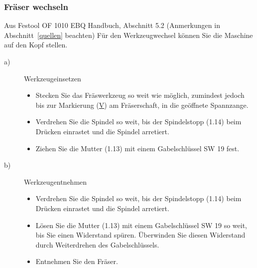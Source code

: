 \documentclass{\basedir/fablab-document}
\begin{document}
\subsubsection{Fräser wechseln}
\begin{leftbar}{Aus Festool OF 1010 EBQ Handbuch, Abschnitt 5.2 (Anmerkungen in Abschnitt~\ref{quellen} beachten)}
Für den Werkzeugwechsel können Sie die Maschine auf den Kopf stellen.
\begin{description}
    \item[a)] Werkzeugeinsetzen
        \begin{itemize}
            \item Stecken Sie das Fräswerkzeug so weit wie möglich, zumindest jedoch bis zur Markierung (\underline{V}) am Fräserschaft, in die geöffnete Spannzange.
            \item Verdrehen Sie die Spindel so weit, bis der Spindelstopp (1.14) beim Drücken einrastet und die Spindel arretiert.
            \item Ziehen Sie die Mutter (1.13) mit einem Gabelschlüssel SW 19 fest.
        \end{itemize}
    \item[b)] Werkzeugentnehmen
        \begin{itemize}
            \item Verdrehen Sie die Spindel so weit, bis der Spindelstopp (1.14) beim Drücken einrastet und die Spindel arretiert.
            \item Lösen Sie die Mutter (1.13) mit einem Gabelschlüssel SW 19 so weit, bis Sie einen Widerstand spüren. Überwinden Sie diesen Widerstand durch Weiterdrehen des Gabelschlüssels.
            \item Entnehmen Sie den Fräser.
        \end{itemize}
\end{description}
\end{leftbar}
\end{document}
